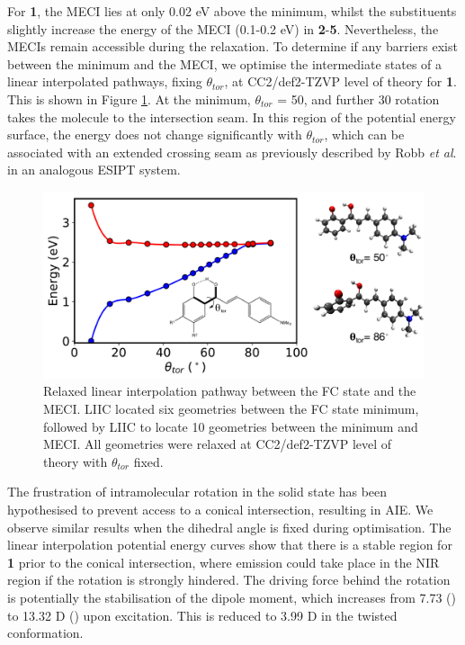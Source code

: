 For \textbf{1}, the MECI lies at only 0.02 eV above the \Kstar{} minimum, whilst the substituents slightly increase the energy of the MECI (0.1-0.2 eV) in \textbf{2}-\textbf{5}. Nevertheless, the MECIs remain accessible during the relaxation. To determine if any barriers exist between the \Kstar{} minimum and the MECI, we optimise the intermediate states of a linear interpolated pathways, fixing $\theta_{tor}$, at CC2/def2-TZVP level of theory for \textbf{1}. This is shown in Figure \ref{figure: H_CC2_LIIC_Scan}. At the \Kstar{} minimum, $\theta_{tor}$ = 50\textdegree, and further 30\textdegree{} rotation takes the molecule to the intersection seam. In this region of the potential energy surface, the \sone{} energy does not change significantly with $\theta_{tor}$, which can be associated with an extended crossing seam as previously described by Robb \textit{et al}. in an analogous ESIPT system.\cite{Paterson2005}

\begin{figure}[t]
\centering
  \includegraphics[width=0.9\linewidth]{3nonradiativedecay/H_CC2_LIIC_Scan.pdf}
  \caption[Potential energy surface along the relaxation mode $\theta_{tor}$]{Relaxed linear interpolation pathway between the FC state and the MECI. LIIC located six geometries between the FC state  \Kstar{} minimum, followed by LIIC to locate 10 geometries between the \Kstar{} minimum and MECI. All geometries were relaxed at CC2/def2-TZVP level of theory with $\theta_{tor}$ fixed.}
  \label{figure: H_CC2_LIIC_Scan}
\end{figure}

The frustration of intramolecular rotation in the solid state has been hypothesised to prevent access to a conical intersection, resulting in \ac{AIE}. We observe similar results when the dihedral angle is fixed during \Kstar{} optimisation. The linear interpolation potential energy curves show that there is a stable \Kstar{} region for \textbf{1} prior to the conical intersection, where emission could take place in the NIR region if the rotation is strongly hindered. The driving force behind the rotation is potentially the stabilisation of the dipole moment, which increases from 7.73 (\szero{}) to 13.32 D (\Estar) upon excitation. This is reduced to 3.99 D in the twisted conformation.

